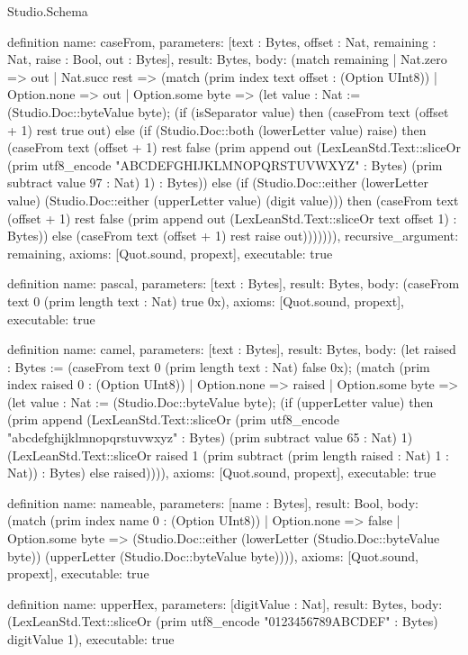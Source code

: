 \begin{lexlean}{Studio.Schema}
\begin{semanticmodule}
definition{
  name: caseFrom,
  parameters: [text : Bytes, offset : Nat, remaining : Nat, raise : Bool, out : Bytes],
  result: Bytes,
  body: (match remaining
    | Nat.zero => out
    | Nat.succ rest => (match (prim index text offset : (Option UInt8))
      | Option.none => out
      | Option.some byte => (let value : Nat := (Studio.Doc::byteValue byte); (if (isSeparator value) then (caseFrom text (offset + 1) rest true out) else (if (Studio.Doc::both (lowerLetter value) raise) then (caseFrom text (offset + 1) rest false (prim append out (LexLeanStd.Text::sliceOr (prim utf8_encode "ABCDEFGHIJKLMNOPQRSTUVWXYZ" : Bytes) (prim subtract value 97 : Nat) 1) : Bytes)) else (if (Studio.Doc::either (lowerLetter value) (Studio.Doc::either (upperLetter value) (digit value))) then (caseFrom text (offset + 1) rest false (prim append out (LexLeanStd.Text::sliceOr text offset 1) : Bytes)) else (caseFrom text (offset + 1) rest raise out))))))),
  recursive_argument: remaining,
  axioms: [Quot.sound, propext],
  executable: true
}

definition{
  name: pascal,
  parameters: [text : Bytes],
  result: Bytes,
  body: (caseFrom text 0 (prim length text : Nat) true 0x),
  axioms: [Quot.sound, propext],
  executable: true
}

definition{
  name: camel,
  parameters: [text : Bytes],
  result: Bytes,
  body: (let raised : Bytes := (caseFrom text 0 (prim length text : Nat) false 0x); (match (prim index raised 0 : (Option UInt8))
    | Option.none => raised
    | Option.some byte => (let value : Nat := (Studio.Doc::byteValue byte); (if (upperLetter value) then (prim append (LexLeanStd.Text::sliceOr (prim utf8_encode "abcdefghijklmnopqrstuvwxyz" : Bytes) (prim subtract value 65 : Nat) 1) (LexLeanStd.Text::sliceOr raised 1 (prim subtract (prim length raised : Nat) 1 : Nat)) : Bytes) else raised)))),
  axioms: [Quot.sound, propext],
  executable: true
}

definition{
  name: nameable,
  parameters: [name : Bytes],
  result: Bool,
  body: (match (prim index name 0 : (Option UInt8))
    | Option.none => false
    | Option.some byte => (Studio.Doc::either (lowerLetter (Studio.Doc::byteValue byte)) (upperLetter (Studio.Doc::byteValue byte)))),
  axioms: [Quot.sound, propext],
  executable: true
}

definition{
  name: upperHex,
  parameters: [digitValue : Nat],
  result: Bytes,
  body: (LexLeanStd.Text::sliceOr (prim utf8_encode "0123456789ABCDEF" : Bytes) digitValue 1),
  executable: true
}


\end{semanticmodule}
\end{lexlean}
